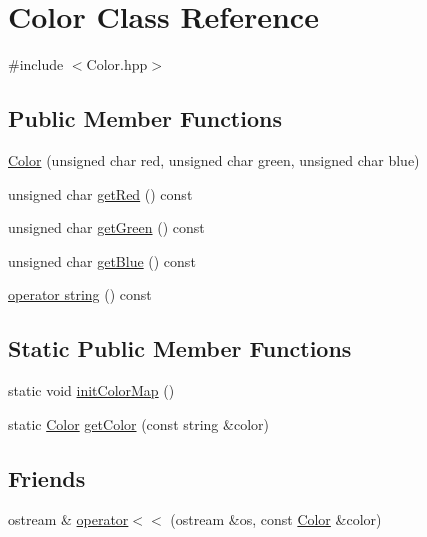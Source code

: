 \hypertarget{class_color}{}\section{Color Class Reference}
\label{class_color}


{\ttfamily \#include $<$Color.\+hpp$>$}

\subsection*{Public Member Functions}
\begin{DoxyCompactItemize}
\item 
\hyperlink{class_color_a0787459fe72580ad9b96a774b1da4c06}{Color} (unsigned char red, unsigned char green, unsigned char blue)
\item 
unsigned char \hyperlink{class_color_a366040ee493dc797f3877c747f70245e}{get\+Red} () const
\item 
unsigned char \hyperlink{class_color_ae97f0bb0f55f82c2e824899d9f8f60ad}{get\+Green} () const
\item 
unsigned char \hyperlink{class_color_afda694abe0a33c924daf178603f44752}{get\+Blue} () const
\item 
\hyperlink{class_color_ac245c9d05bd9409245905b6f15c30f1a}{operator string} () const
\end{DoxyCompactItemize}
\subsection*{Static Public Member Functions}
\begin{DoxyCompactItemize}
\item 
static void \hyperlink{class_color_aba1211bd466bce64d3076af2a55d9785}{init\+Color\+Map} ()
\item 
static \hyperlink{class_color}{Color} \hyperlink{class_color_a94697e8c9eb81124c5a7c1439e1e7348}{get\+Color} (const string \&color)
\end{DoxyCompactItemize}
\subsection*{Friends}
\begin{DoxyCompactItemize}
\item 
ostream \& \hyperlink{class_color_aaa4c7d27cb5d200e5d58e49962d9d9e8}{operator$<$$<$} (ostream \&os, const \hyperlink{class_color}{Color} \&color)
\end{DoxyCompactItemize}


